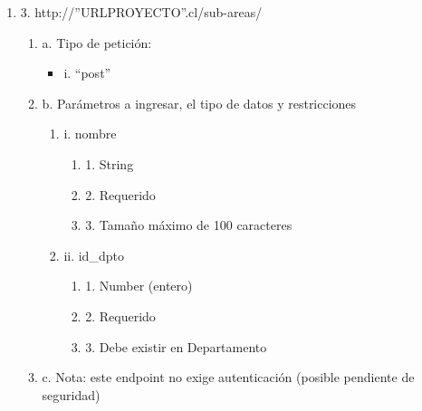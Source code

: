 \begin{enumerate}
    \item 3. http://”URLPROYECTO”.cl/sub-areas/
    \begin{enumerate}
        \item a. Tipo de petición:
            \begin{itemize}
               \item i. “post”
            \end{itemize}
        \item b. Parámetros a ingresar, el tipo de datos y restricciones
            \begin{enumerate}
                \item i. nombre
                    \begin{enumerate}
                        \item 1. String
                        \item 2. Requerido
                        \item 3. Tamaño máximo de 100 caracteres
                    \end{enumerate}
                \item ii. id\_dpto
                    \begin{enumerate}
                        \item 1. Number (entero)
                        \item 2. Requerido
                        \item 3. Debe existir en Departamento
                    \end{enumerate}
            \end{enumerate}
        \item c. Nota: este endpoint no exige autenticación (posible pendiente de seguridad)
    \end{enumerate}


\end{enumerate}
